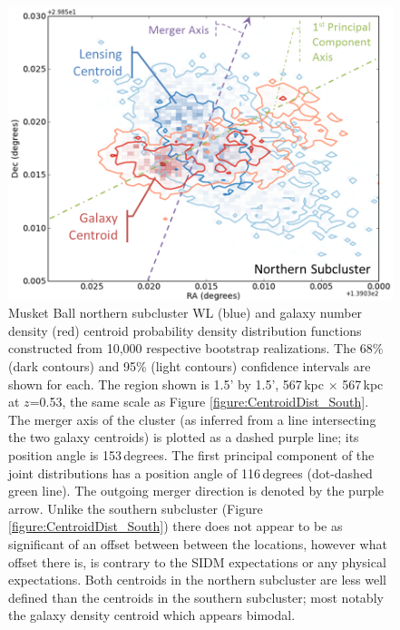 \begin{figure}
\centering
\includegraphics[width=5in]{Chapter4/AnalysisFiles/northcentroids_histplot2d_reformat.png}
\caption[Musket Ball northern subcluster galaxy and weak lensing centroid spatial distribution.]{
Musket Ball northern subcluster WL (blue) and galaxy number density (red) centroid probability density distribution functions constructed from 10,000 respective bootstrap realizations.
The 68\% (dark contours) and 95\% (light contours) confidence intervals are shown for each.
The region shown is 1.5' by 1.5', 567\,kpc $\times$ 567\,kpc at $z$=0.53, the same scale as Figure \ref{figure:CentroidDist_South}.
The merger axis of the cluster (as inferred from a line intersecting the two galaxy centroids) is plotted as a dashed purple line; its position angle is 153\,degrees.
The first principal component of the joint distributions has a position angle of 116\,degrees (dot-dashed green line).
The outgoing merger direction is denoted by the purple arrow.
Unlike the southern subcluster (Figure \ref{figure:CentroidDist_South}) there does not appear to be as significant of an offset between between the locations, however what offset there is, is contrary to the SIDM expectations or any physical expectations.
Both centroids in the northern subcluster are less well defined than the centroids in the southern subcluster; most notably the galaxy density centroid which appears bimodal.
}
\label{figure:CentroidDist_North}
\end{figure}

